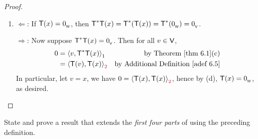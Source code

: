 \begin{proof}
\begin{enumerate}
\item

\(\Longleftarrow\): If \(\textsf{T}(x) = 0_{_{\textsf{W}}}\), then \(\textsf{T}^*\textsf{T}(x) = \textsf{T}^*(\textsf{T}(x)) = \textsf{T}^*(0_{_{\textsf{W}}}) = 0_{_{\textsf{V}}}\).

\(\Longrightarrow\): Now suppose \(\textsf{T}^*\textsf{T}(x) = 0_{_{\textsf{V}}}\).
Then for all \(v \in \textsf{V}\),
\begin{align*}
    0 & = \LG v, \T^*\T(x) \RG_1 & \text{by \THM{6.1}(c)} \\
      & = \LG \T(v), \T(x) \RG_{\MAROON{2}} & \text{by \ADEF{6.5}}
\end{align*}
In particular, let \(v = x\), we have \(0 = \LG \T(x), \T(x) \RG_{\MAROON{2}}\), hence by (d), \(\textsf{T}(x) = 0_{_{\textsf{W}}}\), as desired.
\end{enumerate}
\end{proof}

\begin{exercise} \label{exercise 6.3.16}
State and prove a result that extends the \emph{first four parts} of  using the preceding definition.
\end{exercise}

